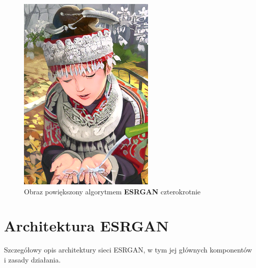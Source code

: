 \begin{figure}[ht]
\begin{minipage}[t]{0.4\linewidth}
    \end{minipage}
    \hspace{0.5cm}
    \begin{minipage}[t]{0.4\linewidth}
        \includegraphics[width=\linewidth]{Rozdziały/02.Podstawy_teoretyczne/Obrazy/comic_ESRGAN_x4.png}
        \caption{Obraz powiększony algorytmem \textbf{ESRGAN} czterokrotnie}
        \label{fig:image61}
    \end{minipage}
\end{figure}


\section{Architektura ESRGAN}


Szczegółowy opis architektury sieci ESRGAN, w tym jej głównych komponentów i zasady działania.



